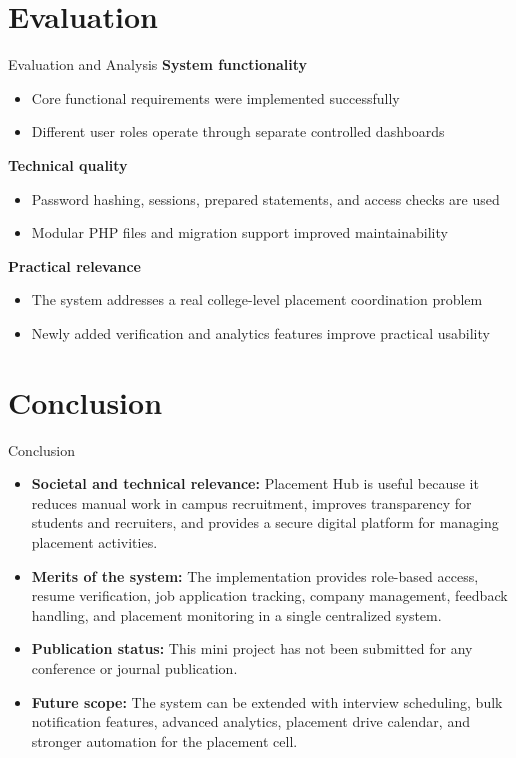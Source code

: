 \documentclass{beamer}
\begin{document}
\section{Evaluation}
\begin{frame}{Evaluation and Analysis}
\small
\textbf{System functionality}
\begin{itemize}
\item Core functional requirements were implemented successfully
\item Different user roles operate through separate controlled dashboards
\end{itemize}

\textbf{Technical quality}
\begin{itemize}
\item Password hashing, sessions, prepared statements, and access checks are used
\item Modular PHP files and migration support improved maintainability
\end{itemize}

\textbf{Practical relevance}
\begin{itemize}
\item The system addresses a real college-level placement coordination problem
\item Newly added verification and analytics features improve practical usability
\end{itemize}
\end{frame}

\section{Conclusion}
\begin{frame}{Conclusion}
\small
\begin{itemize}
\item \textbf{Societal and technical relevance:} Placement Hub is useful because it reduces manual work in campus recruitment, improves transparency for students and recruiters, and provides a secure digital platform for managing placement activities.
\item \textbf{Merits of the system:} The implementation provides role-based access, resume verification, job application tracking, company management, feedback handling, and placement monitoring in a single centralized system.
\item \textbf{Publication status:} This mini project has not been submitted for any conference or journal publication.
\item \textbf{Future scope:} The system can be extended with interview scheduling, bulk notification features, advanced analytics, placement drive calendar, and stronger automation for the placement cell.
\end{itemize}
\end{frame}
\end{document}

